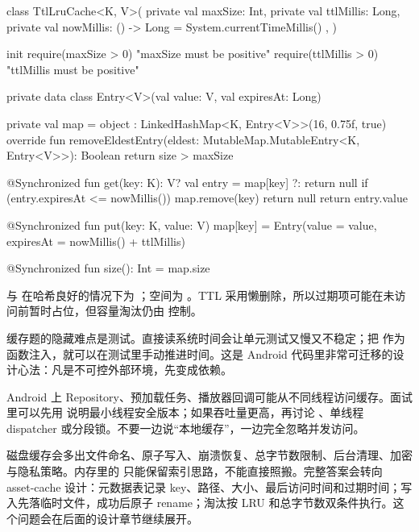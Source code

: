 \begin{kotlin}
class TtlLruCache<K, V>(
    private val maxSize: Int,
    private val ttlMillis: Long,
    private val nowMillis: () -> Long = { System.currentTimeMillis() },
) {
    init {
        require(maxSize > 0) { "maxSize must be positive" }
        require(ttlMillis > 0) { "ttlMillis must be positive" }
    }

    private data class Entry<V>(val value: V, val expiresAt: Long)

    private val map = object : LinkedHashMap<K, Entry<V>>(16, 0.75f, true) {
        override fun removeEldestEntry(eldest: MutableMap.MutableEntry<K, Entry<V>>): Boolean {
            return size > maxSize
        }
    }

    @Synchronized
    fun get(key: K): V? {
        val entry = map[key] ?: return null
        if (entry.expiresAt <= nowMillis()) {
            map.remove(key)
            return null
        }
        return entry.value
    }

    @Synchronized
    fun put(key: K, value: V) {
        map[key] = Entry(value = value, expiresAt = nowMillis() + ttlMillis)
    }

    @Synchronized
    fun size(): Int = map.size
}
\end{kotlin}

\begin{keypoint}[复杂度]
 与  在哈希良好的情况下为 ；空间为 。TTL 采用懒删除，所以过期项可能在未访问前暂时占位，但容量淘汰仍由  控制。
\end{keypoint}

\begin{idea}[把时间作为依赖注入]
缓存题的隐藏难点是测试。直接读系统时间会让单元测试又慢又不稳定；把  作为函数注入，就可以在测试里手动推进时间。这是 Android 代码里非常可迁移的设计心法：凡是不可控外部环境，先变成依赖。
\end{idea}

\begin{pitfall}[线程安全别轻描淡写]
Android 上 Repository、预加载任务、播放器回调可能从不同线程访问缓存。面试里可以先用  说明最小线程安全版本；如果吞吐量更高，再讨论 、单线程 dispatcher 或分段锁。不要一边说“本地缓存”，一边完全忽略并发访问。
\end{pitfall}

\begin{followup}
磁盘缓存会多出文件命名、原子写入、崩溃恢复、总字节数限制、后台清理、加密与隐私策略。内存里的  只能保留索引思路，不能直接照搬。完整答案会转向 asset-cache 设计：元数据表记录 key、路径、大小、最后访问时间和过期时间；写入先落临时文件，成功后原子 rename；淘汰按 LRU 和总字节数双条件执行。这个问题会在后面的设计章节继续展开。
\end{followup}
